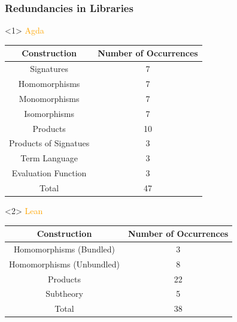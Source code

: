 \documentclass[t,10pt,numbers,fleqn,usenames,xcolor=dvipsnames]{beamer}
\begin{document}
\begin{frame}[fragile] 
\frametitle{Redundancies in Libraries} 
\begin{onlyenv}<1>
\textcolor{Orange}{Agda}
\begin{table}
\begin{adjustbox}{width=0.5\columnwidth}
\begin{tabular}{| c || c |}
\hline 
\textbf{Construction} & \textbf{Number of Occurrences} \\ \hline 
Signatures & 7 \\ \hline
Homomorphisms & 7  \\ \hline
Monomorphisms & 7 \\ \hline
Isomorphisms & 7 \\ \hline
Products & 10 \\ \hline
Products of Signatues & 3 \\ \hline
Term Language & 3 \\ \hline
Evaluation Function & 3 \\ \hline\hline 
Total & 47 \\ \hline 
\end{tabular}
\end{adjustbox}
\end{table}
\end{onlyenv} 
\begin{onlyenv}<2>%
\textcolor{Orange}{Lean}
\begin{table}
\begin{adjustbox}{width=0.5\columnwidth}
\begin{tabular}{| c || c |}
\hline 
\textbf{Construction} & \textbf{Number of Occurrences} \\ \hline 
Homomorphisms (Bundled) & 3 \\ \hline
Homomorphisms (Unbundled)& 8  \\ \hline
Products & 22 \\ \hline
Subtheory & 5 \\ \hline\hline 
Total & 38 \\ \hline 
\end{tabular}
\end{adjustbox}
\end{table} 
\end{onlyenv} 
\end{frame}
\end{document}
